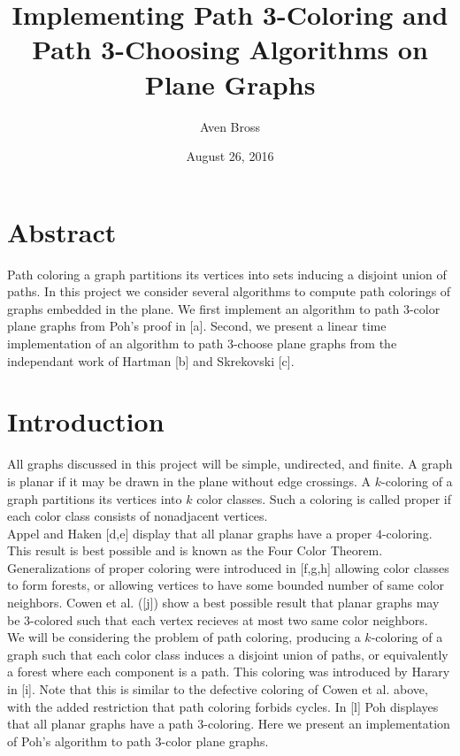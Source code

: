 \documentclass[11pt,letter]{article}
\begin{document}
\title{Implementing Path 3-Coloring and Path 3-Choosing Algorithms on Plane Graphs}
\author{Aven Bross}
\date{August 26, 2016}

\maketitle

\section*{Abstract}

Path coloring a graph partitions its vertices into sets inducing a disjoint union of paths. In this project
we consider several algorithms to compute path colorings of graphs embedded in the plane. We
first implement an algorithm to path 3-color plane graphs from Poh's proof in [a]. Second, we present a linear time
implementation of an algorithm to path 3-choose plane graphs from the independant work of Hartman [b] and
Skrekovski [c].

\section{Introduction}

All graphs discussed in this project will be simple, undirected, and finite. A graph is planar if it may
be drawn in the plane without edge crossings. A $k$-coloring of a graph partitions
its vertices into $k$ color classes. Such a coloring is called proper if each color class consists of
nonadjacent vertices.\\

\noindent Appel and Haken [d,e] display that all planar graphs have a proper $4$-coloring.
This result is best possible and is known as the Four Color Theorem.
Generalizations of proper coloring were introduced in [f,g,h] allowing color classes to form forests, or allowing vertices
to have some bounded number of same color neighbors. Cowen et al. ([j]) show a best possible result that planar
graphs may be $3$-colored such that each vertex recieves at most two same color neighbors.\\

\noindent We will be considering the problem of path coloring, producing a $k$-coloring of a graph such that each color
class induces a disjoint union of paths, or equivalently a forest where each component is a path. This coloring
was introduced by Harary in [i]. Note that this is similar to the defective coloring of Cowen et al. above,
with the added restriction that path coloring forbids cycles. In [l] Poh displayes that all
planar graphs have a path $3$-coloring. Here we present an implementation of Poh's algorithm to path
$3$-color plane graphs.\\
\end{document}
